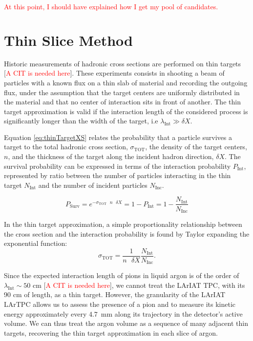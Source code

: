 \documentclass[aps,prl,twocolumn,showpacs,superscriptaddress,groupedaddress]{revtex4}  %
\begin{document}
\textcolor{red}{At this point, I should have explained how I get my pool of candidates.}

\section{\label{sec:ThinSliceMethod}Thin Slice Method}
Historic measurements of hadronic cross sections are performed on thin targets [\textcolor{red}{A CIT is needed here}]. These experiments consists in shooting a beam of particles with a known flux on a thin slab of material and recording the outgoing flux, under the assumption that the target centers are uniformly distributed in the material and that no center of interaction sits in front of another. The thin target approximation is valid if the interaction length of the considered process is significantly longer than the width of the target, i.e $\lambda_{\text{Int}} \gg \delta X$.

Equation \ref{eq:thinTargetXS} relates the probability that a particle survives a target to the total hadronic cross section, $\sigma_{\text{TOT}}$, the density of the target centers, $n$,  and  the thickness of the target  along the incident hadron direction, $\delta X$. The survival probability can be expressed in terms of the interaction probability $P_{\text{Int}}$, represented by ratio between the number of particles interacting in the thin target $N_{\text{Int}}$ and the number of incident particles $N_{\text{Inc}}$.

\begin{equation}
P_{\text{Surv}} = e^{-\sigma_{\text{TOT}}\text{ } n \text{ }\delta X} = 1- P_{\text{Int}}  = 1 - \frac{N_{\text{Int}}}{N_{\text{Inc}}} 
\label{eq:thinTargetXS}
\end{equation}

In the thin target approximation,  a simple proportionality relationship between the cross section and the interaction probability is found by Taylor expanding the exponential function:
 \begin{equation}
 \sigma_{\text{TOT}}  = \frac{1}{n \text{ }\delta X}\frac{N_{\text{Int}}}{N_{\text{Inc}}}.
\label{eq:thinTargetXSSolved}
\end{equation}

Since the expected interaction length of pions in liquid argon is of the order of $\lambda_{\text{Int}} \sim 50$ cm [\textcolor{red}{A CIT is needed here}], we cannot treat the LArIAT TPC, with its 90 cm of length,  as a thin target. However, the granularity of the LArIAT LArTPC allows us to assess the presence of a pion and to measure its kinetic energy approximately every 4.7~mm along its trajectory in the detector's active volume. We can thus treat the argon volume as a sequence of many adjacent thin targets, recovering the thin target approximation in each slice of argon. 
\end{document}
